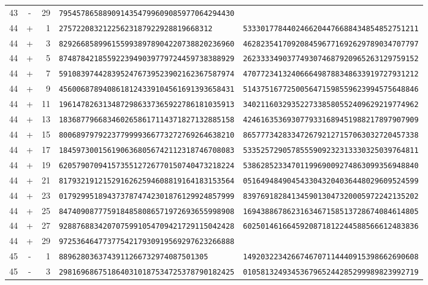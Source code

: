 \begin{longtable}{@{}rcrll@{}}
43&-&29&\texttt{7954578658890914354799609085977064294430}&\texttt{}\\
44&+&1&\texttt{27572208321225623187922928819668312}&\texttt{5333017784402466204476688434854852751211}\\
44&+&3&\texttt{8292668589961559938978904220738820236960}&\texttt{4628235417092084596771692629789034707797}\\
44&+&5&\texttt{8748784218559223949039779724459738388929}&\texttt{2623333490377493074687920965263129759152}\\
44&+&7&\texttt{5910839744283952476739523902162367587974}&\texttt{4707723413240666498788348633919727931212}\\
44&+&9&\texttt{4560068789408618124339104561691393658431}&\texttt{5143751677250056471598559623994575648846}\\
44&+&11&\texttt{1961478263134872986337365922786181035913}&\texttt{3402116032935227338580552409629219774962}\\
44&+&13&\texttt{1836877966834602658617114371827132885158}&\texttt{4246163536930779331689451988217897907909}\\
44&+&15&\texttt{8006897979223779999366773272769264638210}&\texttt{8657773428334726792127157063032720457338}\\
44&+&17&\texttt{1845973001561906368056742112318746708083}&\texttt{5335257290578555909232313330325039764811}\\
44&+&19&\texttt{6205790709415735512726770150740473218224}&\texttt{5386285233470119969009274863099356948840}\\
44&+&21&\texttt{8179321912152916262594608819164183153564}&\texttt{0516494849045433043204036448029609524599}\\
44&+&23&\texttt{0179299518943737874742301876129924857999}&\texttt{8397691828413459013047320005972242135202}\\
44&+&25&\texttt{8474090877759184858086571972693655998908}&\texttt{1694388678623163467158513728674084614805}\\
44&+&27&\texttt{9288768834207075991054709421729115042428}&\texttt{6025014616645920871812244588566612483836}\\
44&+&29&\texttt{9725364647737754217930919569297623266888}&\texttt{}\\
45&-&1&\texttt{8896280363743911266732974087501305}&\texttt{1492032234266746707114440915398662690608}\\
45&-&3&\texttt{2981696867518640310187534725378790182425}&\texttt{0105813249345367965244285299989823992719}\\

\end{longtable}
